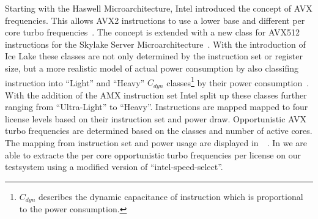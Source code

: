 Starting with the Haswell Microarchitecture, Intel introduced the concept of AVX frequencies.
This allows AVX2 instructions to use a lower base and different per core turbo frequencies~\cite{Hackenberg_2015_Haswell}.
The concept is extended with a new class for AVX512 instructions for the Skylake Server Microarchitecture~\cite[Sec. 2.6.3]{Intel_Optimization_Reference_Manual_050}.
With the introduction of Ice Lake these classes are not only determined by the instruction set or register size, but a more realistic model of actual power consumption by also classifing instruction into ``Light'' and ``Heavy'' $C_{dyn}$ classes\footnote{$C_{dyn}$ describes the dynamic capacitance of instruction which is proportional to the power consumption.} by their power consumption~\cite{papazian_new_2020}.
With the addition of the AMX instruction set Intel split up these classes further ranging from ``Ultra-Light'' to ``Heavy''.
Instructions are mapped mapped to four license levels based on their instruction set and power draw.
Opportunistic AVX turbo frequencies are determined based on the classes and number of active cores.
The mapping from instruction set and power usage are displayed in~~\cite{ServeTheHome_Emerald_Rapids_2023}.
In  we are able to extracte the per core opportunistic turbo frequencies per license on our testsystem using a modified version of ``intel-speed-select''.


